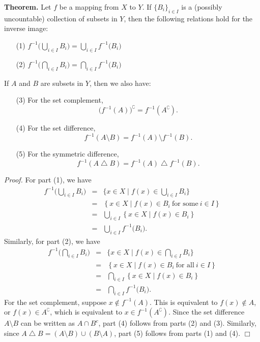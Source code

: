 \documentclass[12pt]{article}
\begin{document}
{\bf Theorem.} 
Let $f$ be a mapping from $X$ to $Y$. If $\{B_i\}_{i\in I}$ is
a (possibly uncountable) collection of subsets in  $Y$, then 
the following relations hold for the inverse image:
\begin{enumerate}
\item[(1)] $ \displaystyle f^{-1}\big(\bigcup_{i\in I} B_i\big) = \bigcup_{i\in I} f^{-1}\big(B_i\big) $
\item[(2)] $ \displaystyle f^{-1}\big(\bigcap_{i\in I} B_i\big) = \bigcap_{i\in I} f^{-1}\big(B_i\big) $
\end{enumerate}
If $A$ and $B$ are subsets in $Y$, then we also have:
\begin{enumerate}
\item[(3)] For the set complement, 
$$\big(f^{-1}(A)\big)^\complement=f^{-1}(A^\complement).$$
\item[(4)] For the set difference, 
$$f^{-1}(A\setminus B) = f^{-1}(A)\setminus f^{-1}(B).$$
\item[(5)] For the symmetric difference, 
$$f^{-1}(A \bigtriangleup B)=f^{-1}(A) \bigtriangleup f^{-1}(B).$$
\end{enumerate}
 
\emph{Proof.} 
For part (1), we have
\begin{eqnarray*}
f^{-1}\big(\bigcup_{i\in I} B_i\big) &=& \Big\{ x\in X\mid f(x) \in \bigcup_{i\in I} B_i\Big\} \\
&=& \left\{ x\in X \mid  f(x) \in B_i\ \mbox{for some}\ i\in I\right\} \\
&=& \bigcup_{i\in I}\left\{ x\in X \mid  f(x) \in B_i \right\} \\
&=& \bigcup_{i\in I} f^{-1}\big(B_i\big).
\end{eqnarray*}
Similarly, for part (2), we have
\begin{eqnarray*}
f^{-1}\big(\bigcap_{i\in I} B_i\big) &=& \big\{ x\in X \mid f(x) \in \bigcap_{i\in I} B_i\big\} \\
&=& \left\{ x\in X \mid f(x) \in B_i\ \mbox{for all}\ i\in I\right\} \\
&=& \bigcap_{i\in I}\left\{ x\in X \mid  f(x) \in B_i \right\} \\
&=& \bigcap_{i\in I} f^{-1}\big(B_i\big).
\end{eqnarray*}
For the set complement, suppose $x\notin f^{-1}(A)$. This is equivalent to
$f(x)\notin A$, or $f(x)\in A^\complement$, which is equivalent to 
$x\in f^{-1}(A^\complement)$. Since the set difference  $A\setminus B$ can be
written as $A\cap B^c$, part (4) follows from parts (2) and 
(3). Similarly, since $A\bigtriangleup B=(A\setminus B) \cup (B\setminus A)$,
part (5) follows from parts (1) and 
(4). $\Box$
\end{document}
